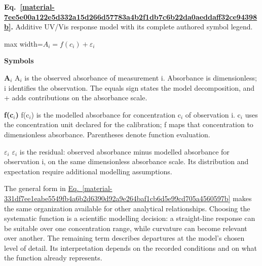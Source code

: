 \documentclass[11pt,a4paper]{article}
\begin{document}
\par\medskip
\begin{samepage}
\label{material-7ee5e00a122e5d332a15d266d57783a4b2f1db7c6b22da0aeddaff32ce94398b}
\noindent\textbf{Eq.~\ref*{material-7ee5e00a122e5d332a15d266d57783a4b2f1db7c6b22da0aeddaff32ce94398b}.} Additive UV/Vis response model with its complete authored symbol legend.\par\nopagebreak
\begin{center}\begin{adjustbox}{max width=\linewidth}$\displaystyle A_i = f(c_i) + \varepsilon_i$\end{adjustbox}\end{center}

\par\noindent\textbf{Symbols}

\par\noindent\textbf{A\ensuremath{{}_i}} A\ensuremath{{}_i} is the observed absorbance of measurement i. Absorbance is dimensionless; i identifies the observation. The equals sign states the model decomposition, and + adds contributions on the absorbance scale.

\par\noindent\textbf{f(c\ensuremath{{}_i})} f(c\ensuremath{{}_i}) is the modelled absorbance for concentration c\ensuremath{{}_i} of observation i. c\ensuremath{{}_i} uses the concentration unit declared for the calibration; f maps that concentration to dimensionless absorbance. Parentheses denote function evaluation.

\par\noindent\textbf{\ensuremath{\varepsilon}\ensuremath{{}_i}} \ensuremath{\varepsilon}\ensuremath{{}_i} is the residual: observed absorbance minus modelled absorbance for observation i, on the same dimensionless absorbance scale. Its distribution and expectation require additional modelling assumptions.

\end{samepage}
\medskip

The general form in \hyperref[material-331df7ee1eabe5549fb4a6b2d6390d92a9e264baf1cb6d5e99cd705a4560597b]{Eq.~\ref*{material-331df7ee1eabe5549fb4a6b2d6390d92a9e264baf1cb6d5e99cd705a4560597b}} makes the same organization available for other analytical relationships. Choosing the systematic function is a scientific modelling decision: a straight-line response can be suitable over one concentration range, while curvature can become relevant over another. The remaining term describes departures at the model's chosen level of detail. Its interpretation depends on the recorded conditions and on what the function already represents.
\end{document}
